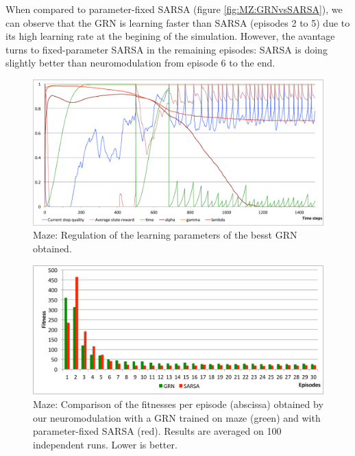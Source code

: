 When compared to parameter-fixed SARSA (figure \ref{fig:MZ:GRNvsSARSA}), we can observe that the GRN is learning faster than SARSA (episodes 2 to 5) due to its high learning rate at the begining of the simulation. However, the avantage turns to fixed-parameter SARSA in the remaining episodes: SARSA is doing slightly better than neuromodulation from episode 6 to the end.

\begin{figure}[h]
\center
\includegraphics[width=\linewidth]{MZ_GRNBehavior.pdf}
\caption{Maze: Regulation of the learning parameters of the besst GRN obtained.}\label{fig:MZ:GRNBehavior}
\end{figure}

\begin{figure}[h]
\center
\includegraphics[width=\linewidth]{MZ_GRNvsSARSA.pdf}
\caption{Maze: Comparison of the fitnesses per episode (abscissa) obtained by our neuromodulation with a GRN trained on maze (green) and with parameter-fixed SARSA (red). Results are averaged on 100 independent runs. Lower is better.}\label{fig:MC:GRNvsSARSA}
\end{figure}


